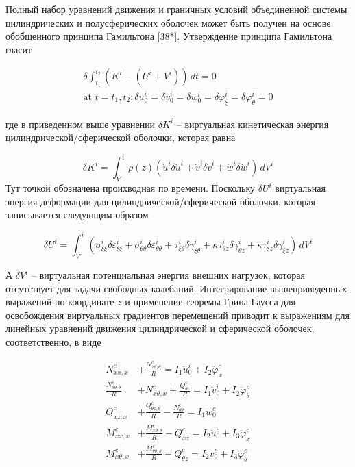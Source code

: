 Полный набор уравнений движения и граничных условий объединенной системы цилиндрических и полусферических оболочек может быть получен на основе обобщенного принципа Гамильтона [38*]. Утверждение принципа Гамильтона гласит

\begin{equation}
	\label{eq:vibro1:14}
	\begin{split}
	\delta \int_{t_1}^{t_2} \left (K^i - \left ( U^i +V^i \right ) \right )\,dt = 0 \\
	\text{at } t=t_1,t_2: \delta u_0^i= \delta v_0^i=\delta w_0^i=\delta \varphi_{\xi}^i= \delta \varphi_{\theta}^i=0
	\end{split}
\end{equation}

где в приведенном выше уравнении \(\delta K^i\) -- виртуальная кинетическая энергия цилиндрической/сферической оболочки, которая равна

\begin{equation}
	\label{eq:vibro1:15}
	\delta K^i = \int_V^i \rho (z) \left ( \dot{u}^i \delta \dot{u}^i + \dot{v}^i \delta \dot{v}^i + \dot{w}^i \delta \dot{w}^i \right )\, dV^i
\end{equation} 
Тут точкой обозначена проихводная по времени. Поскольку \(\delta U^i\) виртуальная энергия деформации для цилиндрической/сферической оболочки, которая записывается следующим образом

\begin{equation}
	\label{eq:vibro1:16}
	\delta U^i = \int_V^i \left ( \sigma_{\xi \xi}^i \delta \varepsilon_{\xi \xi}^i + \sigma_{\theta \theta}^i \delta \varepsilon_{\theta \theta}^i +  \tau_{\xi \theta}^i \delta \gamma_{\xi \theta}^i + \kappa \tau_{\theta z}^i \delta \gamma_{\theta z}^i + \kappa \tau_{\xi z}^i \delta \gamma_{\xi z}^i \right ) \, dV^i
\end{equation}

А \(\delta V^i \) -- виртуальная потенциальная энергия внешних нагрузок, которая отсутствует для задачи свободных колебаний. Интегрирование вышеприведенных выражений по координате \(z\) и применение теоремы Грина-Гаусса для освобождения виртуальных градиентов перемещений приводит к выражениям для линейных уравнений движения цилиндрической и сферической оболочек, соответственно, в виде

\begin{equation}
	\label{eq:vibro1:17}
	\begin{split}
	N_{xx,x}^c &+ \frac{N_{x \theta,\theta}^c}{R} = I_1 \ddot{u}_0^i+I_2 \ddot{\varphi}_x^c
	\\
	\frac{N_{\theta \theta,\theta}^c}{R} &+ N_{x \theta,x}^c + \frac{Q_{\theta z}^c}{R} = I_1 \ddot{v}_0^i+I_2 \ddot{\varphi}_{\theta}^c
	\\
	Q_{xz,x}^c &+ \frac{Q_{\theta z,\theta}^c}{R} - \frac{N_{\theta \theta}^c}{R} = I_1 \ddot{w}_0^c
	\\
	M_{xx,x}^c &+ \frac{M_{x \theta, \theta}^c}{R} - Q_{xz}^c = I_2 \ddot{u}_0^c + I_3 \ddot{\varphi}_x^c
	\\
	M_{x \theta,x}^c &+ \frac{M_{\theta \theta, \theta}^c}{R} - Q_{\theta z}^c = I_2 \ddot{v}_0^c + I_3 \ddot{\varphi}_{\theta}^c
	\end{split}
\end{equation} 


